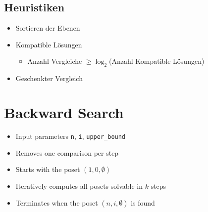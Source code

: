 \subsection{Heuristiken}

\begin{frame}{\insertsubsection}

  \begin{itemize}
    \item<+-> Sortieren der Ebenen
    \item<+-> Kompatible Lösungen
      \begin{itemize}
        \item Anzahl Vergleiche $\geq \log_2$(Anzahl Kompatible Lösungen)
      \end{itemize}
    \item<+-> Geschenkter Vergleich
      \begin{figure}
        \centering
      \end{figure}
  \end{itemize}

\end{frame}

\author{SEA 2025 \hspace{1cm} Julius von Smercek}

\section{Backward Search}
\sectionframe{\insertsection}
\begin{frame}{\insertsection}
  \begin{itemize}
    \item<+-> Input parameters \texttt{n}, \texttt{i}, \texttt{upper\_bound}
    \item<+-> Removes one comparison per step
    \item<+-> Starts with the poset $(1, 0, \emptyset)$ %
    \item<+-> Iteratively computes all posets solvable in $k$ steps %
    \item<+-> Terminates when the poset $(n, i, \emptyset)$ is found %
  \end{itemize}
\end{frame}


